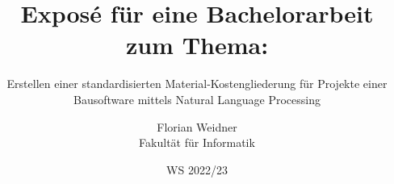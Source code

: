 \documentclass[twoside=true, %
    DIV=15
    ,%
    BCOR=15mm, %
    headinclude=true,
    footinclude=false,
    pagesize,%
    fontsize=12pt,%
    paper=a4,%
    numbers=noenddot
  ]{scrartcl}
\begin{document}
\def\figdir{figures}
\def\tabledir{tables}

\titlehead{
\raggedleft
\texttt{[image: \\figdir/logo-th-rosenheim-2019\_master\_quer\_2c.eps]}
}
\title{
	Exposé für eine Bachelorarbeit zum Thema:
}
\subtitle{
\vspace*{0cm}
Erstellen einer standardisierten Material-Kostengliederung für Projekte einer Bausoftware mittels Natural Language Processing
}

\author{
Florian Weidner\\
Fakultät für Informatik}

\date{WS 2022/23}

\maketitle

\pagebreak
\tableofcontents










\appendix





\end{document}
